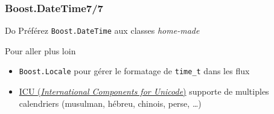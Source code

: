 \documentclass[C++.tex]{subfiles}
\begin{document}
\begin{frame}[fragile]
	\frametitle{Boost.DateTime\titlehfill{}7/7}
	\begin{exampleblock}{Do}
		Préférez \lstinline|Boost.DateTime| aux classes \textit{home-made}
	\end{exampleblock}

	\begin{block}{Pour aller plus loin}
		\begin{itemize}
			\item \lstinline|Boost.Locale| pour gérer le formatage de \lstinline|time_t| dans les flux


			\item \href{http://site.icu-project.org/}{ICU (\textit{International Components for Unicode})} supporte de multiples calendriers (musulman, hébreu, chinois, perse, \ldots)

		\end{itemize}
	\end{block}
\end{frame}
\end{document}
